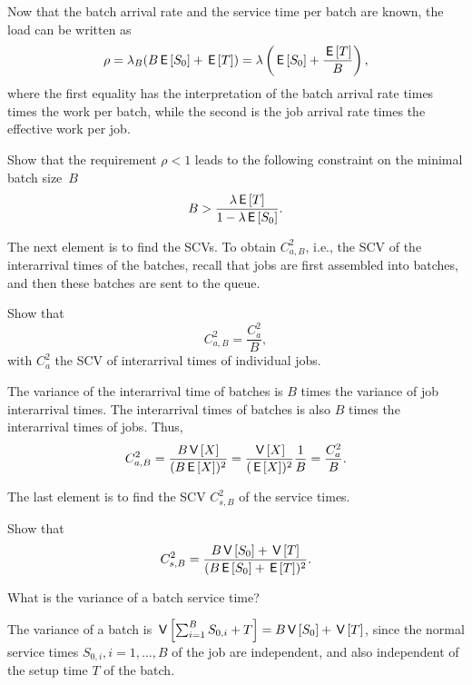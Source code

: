 Now that  the batch arrival rate and the service time per batch are known, the load can be written as
\begin{equation*}
\rho = \lambda_B (B \,\mathsf{E}\left[S_0\right] + \,\mathsf{E}\left[T\right]) = \lambda \left(\,\mathsf{E}\left[S_0\right] + \frac{\,\mathsf{E}\left[T\right]}B\right),
\end{equation*}
where the first equality has the interpretation of the batch arrival rate times times the work per batch, while the second is the job arrival rate times the effective work per job. 

\begin{exercise} 
Show that the requirement $\rho < 1$ leads to the following constraint on the minimal batch size~$B$ 
  \begin{equation*}
 B>\frac{\lambda \,\mathsf{E}\left[T\right]}{1-\lambda \,\mathsf{E}\left[S_0\right]}.
  \end{equation*}
\end{exercise}

The next element is to find the SCVs. To obtain $C_{a,B}^2$, i.e., the SCV of the interarrival times of the batches, recall that jobs are first assembled into batches, and then these batches are sent to the queue.

\begin{exercise}
 Show that 
 \begin{equation*}
C_{a,B}^2 = \frac{C_{a}^2}B,
 \end{equation*}
with $C_a^2$ the SCV of interarrival times of individual jobs.
  \begin{solution}
The variance of the interarrival time of batches is $B$ times the variance of job interarrival times. The interarrival times of batches is also $B$ times the interarrival times of jobs. Thus, 
\begin{equation*}
  C_{a,B}^2 = \frac{B \,\mathsf{V}\left[X\right]}{(B \,\mathsf{E}\left[X\right])^2} = \frac{\,\mathsf{V}\left[X\right]}{(\,\mathsf{E}\left[X\right])^2} \frac 1 B =  \frac{C_a^2}{B}.
\end{equation*}
  \end{solution}
\end{exercise}

The last element is to find the SCV $C_{s,B}^2$ of the service times.

\begin{exercise}
Show that
\begin{equation*}
C_{s, B}^2 = \frac{B \,\mathsf{V}\left[S_0\right] + \,\mathsf{V}\left[T\right]}{(B \,\mathsf{E}\left[S_0\right] + \,\mathsf{E}\left[T\right])^2}.
\end{equation*}
\begin{hint}
  What is the variance of a batch service time?
\end{hint}
\begin{solution}
  The variance of a batch is $\,\mathsf{V}\left[\sum_{i=1}^B S_{0,i} + T\right] = B\,\mathsf{V}\left[S_0\right] + \,\mathsf{V}\left[T\right]$, since the normal service times $S_{0,i}, i=1,\ldots, B$ of the job are independent, and also independent of the setup time $T$  of the batch.
\end{solution}
\end{exercise}


